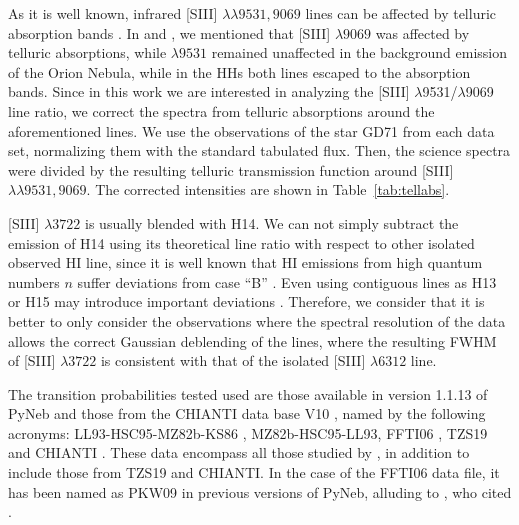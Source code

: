 \documentclass[fleqn,usenatbib]{mnras}
\begin{document}
As it is well known, infrared [S\thinspace III] $\lambda \lambda 9531, 9069$ lines can be affected by telluric absorption bands \citep{Noll12}. In \citet{mendez2021} and \citet{mendez2021-2}, we mentioned that [S\thinspace III] $\lambda 9069$ was affected by telluric absorptions, while $\lambda 9531$ remained unaffected in the background emission of the Orion Nebula, while in the HHs both lines escaped to the absorption bands. Since in this work we are interested in analyzing the [S\thinspace III] $\lambda$9531/$\lambda$9069 line ratio, we correct the spectra from telluric absorptions around the aforementioned lines. We use the observations of the star GD71 from each data set, normalizing them with the standard tabulated flux. Then, the science spectra were divided by the resulting telluric transmission function around [S\thinspace III] $\lambda \lambda 9531, 9069$. The corrected intensities are shown in Table~\ref{tab:tellabs}. 

[S\thinspace III] $\lambda 3722$ is usually blended with H14. We can not simply subtract the emission of H14 using its theoretical line ratio with respect to other isolated observed H\thinspace I line, since it is well known that H\thinspace I emissions from high quantum numbers $n$ suffer deviations from case ``B'' \citep[][]{mesadelgado09, rodriguez20}. Even using  contiguous lines as H13 or H15 may introduce important deviations \citep[See Fig.~A2 of][]{rodriguez20}. Therefore, we consider that it is better to only consider the observations where the spectral resolution of the data allows the correct Gaussian deblending of the lines, where the resulting FWHM of [S\thinspace III] $\lambda 3722$ is consistent with that of the isolated [S\thinspace III] $\lambda 6312$ line.

The transition probabilities tested used are those available in version 1.1.13 of PyNeb and those from the CHIANTI data base V10 \citep[][]{Chianti10}, named by the following acronyms: LL93-HSC95-MZ82b-KS86 \citep[][]{LL93,HSC95,MZ82b, KS86}, MZ82b-HSC95-LL93\citep[][]{MZ82b,HSC95,LL93}, FFTI06 \citep[][]{FFTI06}, TZS19\citep[][]{TZS19} and CHIANTI \citep[][]{Tayal97,FFTI06, Hudson12}. These data encompass all those studied by \citet{Juan-de-Dios17}, in addition to include those from TZS19 and CHIANTI. In the case of the FFTI06 data file, it has been named as PKW09 in previous versions of PyNeb, alluding to \citet{Podobedova09}, who cited \citet{FFTI06}. 
\end{document}
